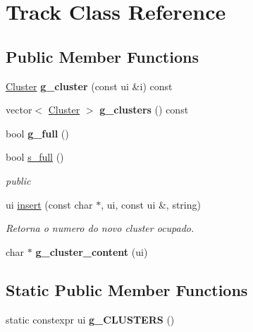 \hypertarget{classTrack}{}\section{Track Class Reference}
\label{classTrack}
\subsection*{Public Member Functions}
\begin{DoxyCompactItemize}
\item 
\hyperlink{classCluster}{Cluster} {\bfseries g\+\_\+cluster} (const ui \&i) const \hypertarget{classTrack_a1b68a43b28d8c26d7af01a9a8e8c1ddf}{}\label{classTrack_a1b68a43b28d8c26d7af01a9a8e8c1ddf}

\item 
vector$<$ \hyperlink{classCluster}{Cluster} $>$ {\bfseries g\+\_\+clusters} () const \hypertarget{classTrack_ad84a7049f08ce72e64d6183b9e41c6f4}{}\label{classTrack_ad84a7049f08ce72e64d6183b9e41c6f4}

\item 
bool {\bfseries g\+\_\+full} ()\hypertarget{classTrack_ad93cf5c10d7170353b0476216857c3ce}{}\label{classTrack_ad93cf5c10d7170353b0476216857c3ce}

\item 
bool \hyperlink{classTrack_a84b7957f08de9ffe8c53fb7050f38cdd}{s\+\_\+full} ()
\begin{DoxyCompactList}\small\item\em public \end{DoxyCompactList}\item 
ui \hyperlink{classTrack_a9c119d10ee46f6e00fd37425b78d1a43}{insert} (const char $\ast$, ui, const ui \&, string)\hypertarget{classTrack_a9c119d10ee46f6e00fd37425b78d1a43}{}\label{classTrack_a9c119d10ee46f6e00fd37425b78d1a43}

\begin{DoxyCompactList}\small\item\em Retorna o numero do novo cluster ocupado. \end{DoxyCompactList}\item 
char $\ast$ {\bfseries g\+\_\+cluster\+\_\+content} (ui)\hypertarget{classTrack_a95108a0e25c400c8d073c41c1af147c2}{}\label{classTrack_a95108a0e25c400c8d073c41c1af147c2}

\end{DoxyCompactItemize}
\subsection*{Static Public Member Functions}
\begin{DoxyCompactItemize}
\item 
static constexpr ui {\bfseries g\+\_\+\+C\+L\+U\+S\+T\+E\+RS} ()\hypertarget{classTrack_a116fdaace82b411f98b16a7c5e1b91b1}{}\label{classTrack_a116fdaace82b411f98b16a7c5e1b91b1}

\end{DoxyCompactItemize}



